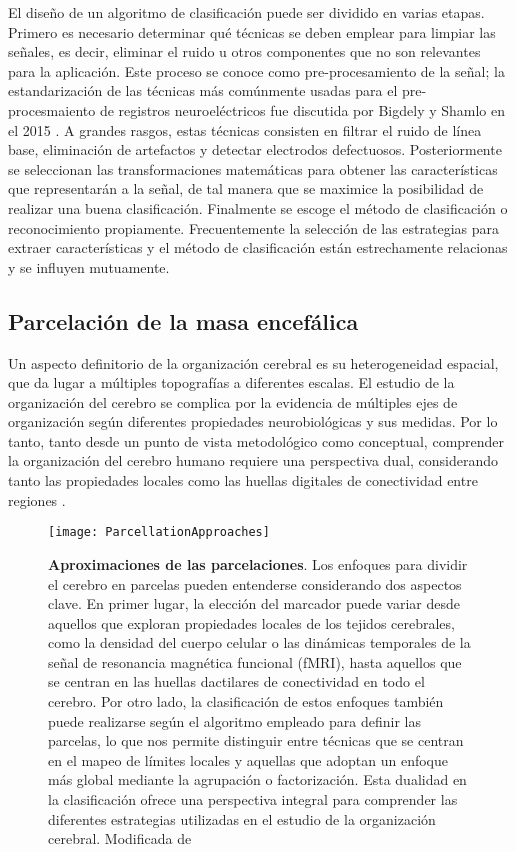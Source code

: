\documentclass[11pt,letterpaper]{article}
\numberwithin{equation}{subsection}
\numberwithin{table}{subsection}
\begin{document}
\smallskip
\noindent El diseño de un algoritmo de clasificación puede ser dividido en varias etapas. Primero es necesario determinar qué técnicas se deben emplear para limpiar las señales, es decir, eliminar el ruido u otros componentes que no son relevantes para la aplicación. Este proceso se conoce como pre-procesamiento de la señal; la estandarización de las técnicas más comúnmente usadas para el pre-procesmaiento de registros neuroeléctricos fue discutida por Bigdely y Shamlo en el 2015 \cite{Bigdely-Shamlo2015}. A grandes rasgos, estas técnicas consisten en filtrar el ruido de línea base, eliminación de artefactos y detectar electrodos defectuosos. Posteriormente se seleccionan las transformaciones matemáticas para obtener las características que representarán a la señal, de tal manera que se maximice la posibilidad de realizar una buena clasificación. Finalmente se escoge el método de clasificación o reconocimiento propiamente. Frecuentemente la selección de las estrategias para extraer características y el método de clasificación están estrechamente relacionas y se influyen mutuamente.

\subsection{Parcelación de la masa encefálica}
\smallskip
\noindent Un aspecto definitorio de la organización cerebral es su heterogeneidad espacial, que da lugar a múltiples topografías a diferentes escalas. El estudio de la organización del cerebro se complica por la evidencia de múltiples ejes de organización según diferentes propiedades neurobiológicas y sus medidas. Por lo tanto, tanto desde un punto de vista metodológico como conceptual, comprender la organización del cerebro humano requiere una perspectiva dual, considerando tanto las propiedades locales como las huellas digitales de conectividad entre regiones \cite{churchland1988perspectives}.



\begin{figure}[H]
\centering
	\texttt{[image: ParcellationApproaches]}
	\captionsetup{labelfont=bf}
	\caption{\scriptsize \textbf{Aproximaciones de las parcelaciones}. Los enfoques para dividir el cerebro en parcelas pueden entenderse considerando dos aspectos clave. En primer lugar, la elección del marcador puede variar desde aquellos que exploran propiedades locales de los tejidos cerebrales, como la densidad del cuerpo celular o las dinámicas temporales de la señal de resonancia magnética funcional (fMRI), hasta aquellos que se centran en las huellas dactilares de conectividad en todo el cerebro. Por otro lado, la clasificación de estos enfoques también puede realizarse según el algoritmo empleado para definir las parcelas, lo que nos permite distinguir entre técnicas que se centran en el mapeo de límites locales y aquellas que adoptan un enfoque más global mediante la agrupación o factorización. Esta dualidad en la clasificación ofrece una perspectiva integral para comprender las diferentes estrategias utilizadas en el estudio de la organización cerebral. Modificada de \cite{eickhoff2018imaging}}
	\label{fig:Fig11}
\end{figure}
\end{document}
